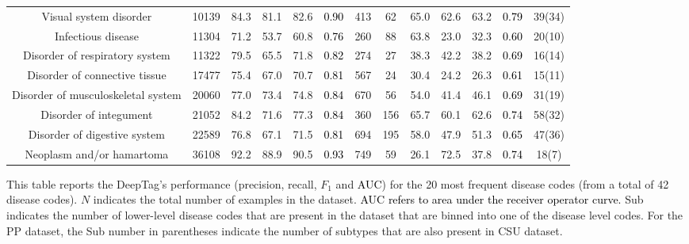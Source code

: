 \documentclass[fleqn,10pt]{wlscirep}
\newcommand{\newedit}[1]{\textcolor{black}{#1}}
\begin{document}
\begin{table}[h]
\begin{adjustwidth}{-0.5in}{0in}
\begin{tabular}{c | c c c c c c | c c c c c c }
Visual system disorder  & 10139 & 84.3 & 81.1 & 82.6 & \newedit{0.90} & 413 & 62 & 65.0 & 62.6 & 63.2 & \newedit{0.79} & 39(34) \\ 
Infectious disease  & 11304 & 71.2 & 53.7 & 60.8 & \newedit{0.76} & 260 & 88 & 63.8 & 23.0 & 32.3 & \newedit{0.60} & 20(10) \\ 
Disorder of respiratory system  & 11322 & 79.5 & 65.5 & 71.8 & \newedit{0.82} & 274 & 27 & 38.3 & 42.2 & 38.2 & \newedit{0.69} & 16(14) \\ 
Disorder of connective tissue  & 17477 & 75.4 & 67.0 & 70.7 & \newedit{0.81} & 567 & 24 & 30.4 & 24.2 & 26.3 & \newedit{0.61} & 15(11) \\ 
Disorder of musculoskeletal system  & 20060 & 77.0 & 73.4 & 74.8 & \newedit{0.84} & 670 & 56 & 54.0 & 41.4 & 46.1 & \newedit{0.69} & 31(19) \\ 
Disorder of integument  & 21052 & 84.2 & 71.6 & 77.3 & \newedit{0.84} & 360 & 156 & 65.7 & 60.1 & 62.6 & \newedit{0.74} & 58(32) \\ 
Disorder of digestive system  & 22589 & 76.8 & 67.1 & 71.5 & \newedit{0.81} & 694 & 195 & 58.0 & 47.9 & 51.3 & \newedit{0.65} & 47(36) \\ 
Neoplasm and/or hamartoma  & 36108 & 92.2 & 88.9 & 90.5 & \newedit{0.93} & 749 & 59 & 26.1 & 72.5 & 37.8 & \newedit{0.74} & 18(7) \\ 
\bottomrule
\end{tabular}
\begin{flushleft} This table reports the DeepTag's performance (precision, recall, $F_1$ and \newedit{AUC}) for the 20 most frequent disease codes (from a total of 42 disease codes). $N$ indicates the total number of examples in the dataset. \newedit{AUC refers to area under the receiver operator curve.} Sub indicates the number of lower-level disease codes that are present in the dataset that are binned into one of the disease level codes. For the PP dataset, the Sub number in parentheses indicate the number of subtypes that are also present in CSU dataset. 
\end{flushleft}
 \label{tab:detailed-csu-pp}
\end{adjustwidth}
\end{table}

\end{document}
